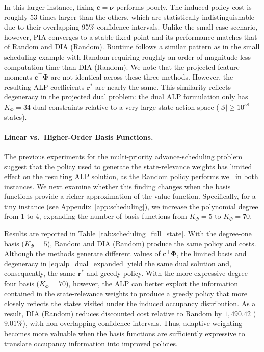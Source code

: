 \documentclass[sglanonrev]{informs4}
\providecommand{\bPhi}{\boldsymbol{\Phi}}
\providecommand{\bc}{\boldsymbol{c}}
\providecommand{\br}{\boldsymbol{r}}
\def\edits#1{{\color{black}#1}}
\begin{document}
In this larger instance, fixing $\bc=\boldsymbol{\nu}$ performs poorly. The induced policy cost is roughly 53 times larger than the others, which are statistically indistinguishable due to their overlapping 95\% confidence intervals. Unlike the small-case scenario, however, \ac{PIA} converges to a stable fixed point and its performance matches that of Random and \ac{DIA} (Random). Runtime follows a similar pattern as in the small scheduling example with Random requiring roughly an order of magnitude less computation time than \ac{DIA} (Random). We note that the projected feature moments $\bc^{\top}\bPhi$ are not identical across these three methods. However, the resulting \ac{ALP} coefficients $\br^{*}$ are nearly the same. This similarity reflects degeneracy in the projected dual problem: the dual ALP formulation only has $K_\Phi = 34$ dual constraints relative to a very large state-action space ($|\mathcal{S}| \geq 10^{58}$ states).

\smallskip
\paragraph{Linear vs.\ Higher-Order Basis Functions.}
\edits{The previous experiments for the multi-priority advance-scheduling problem suggest that the policy used to generate the state-relevance weights has limited effect on the resulting \ac{ALP} solution, as the Random policy performs well in both instances. We next examine whether this finding changes when the basis functions provide a richer approximation of the value function. Specifically, for a tiny instance (see Appendix~\ref{app:scheduling}), we increase the polynomial degree from 1 to 4, expanding the number of basis functions from $K_\Phi=5$ to $K_\Phi=70$.}

\edits{Results are reported in Table~\ref{tab:scheduling_full_state}. With the degree-one basis ($K_\Phi=5$), Random and \ac{DIA} (Random) produce the same policy and costs. Although the methods generate different values of $\bc^\top\bPhi$, the limited basis and degeneracy in \eqref{eq:alp_dual_expanded} yield the same dual solution and, consequently, the same $\br^*$ and greedy policy. With the more expressive degree-four basis ($K_\Phi=70$), however, the \ac{ALP} can better exploit the information contained in the state-relevance weights to produce a greedy policy that more closely reflects the states visited under the induced occupancy distribution. As a result, \ac{DIA} (Random) reduces discounted cost relative to Random by $1,490.42$ ($9.01\%$), with non-overlapping confidence intervals. Thus, adaptive weighting becomes more valuable when the basis functions are sufficiently expressive to translate occupancy information into improved policies.}
\end{document}
